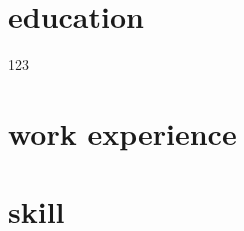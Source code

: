 \documentclass{article}
\begin{document}
	\section{education}
	123
	\section{work experience}
	\section{skill}
\end{document}
